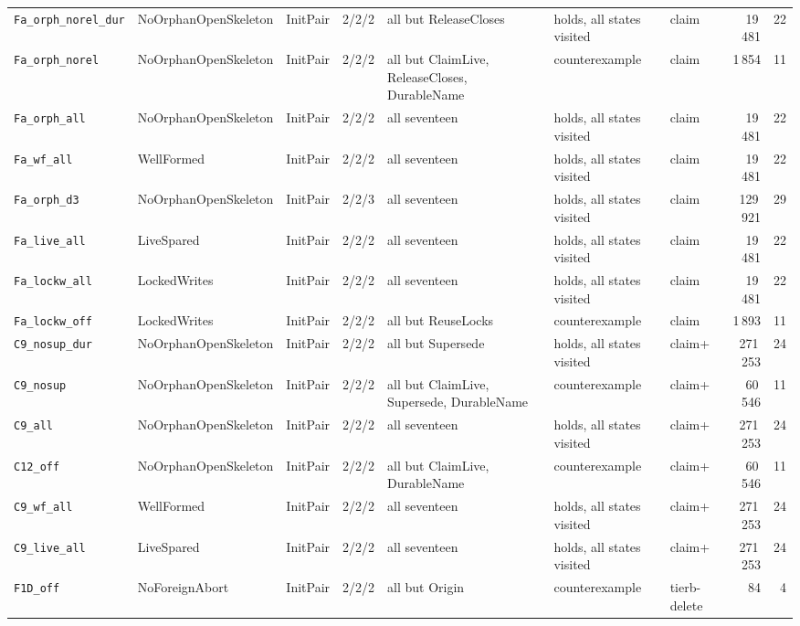 \documentclass[a4paper,10pt,fleqn]{article}
\begin{document}
{\begin{center}
\begin{tabularx}{\textwidth}{@{}l l l l X X l r r@{}}
\texttt{Fa\_orph\_norel\_dur} & NoOrphanOpenSkeleton & InitPair & 2/2/2 & all but ReleaseCloses & holds, all states visited & claim & 19\,481 & 22 \\
\texttt{Fa\_orph\_norel} & NoOrphanOpenSkeleton & InitPair & 2/2/2 & all but ClaimLive, ReleaseCloses, DurableName & counterexample & claim & 1\,854 & 11 \\
\texttt{Fa\_orph\_all} & NoOrphanOpenSkeleton & InitPair & 2/2/2 & all seventeen & holds, all states visited & claim & 19\,481 & 22 \\
\texttt{Fa\_wf\_all} & WellFormed & InitPair & 2/2/2 & all seventeen & holds, all states visited & claim & 19\,481 & 22 \\
\texttt{Fa\_orph\_d3} & NoOrphanOpenSkeleton & InitPair & 2/2/3 & all seventeen & holds, all states visited & claim & 129\,921 & 29 \\
\texttt{Fa\_live\_all} & LiveSpared & InitPair & 2/2/2 & all seventeen & holds, all states visited & claim & 19\,481 & 22 \\
\texttt{Fa\_lockw\_all} & LockedWrites & InitPair & 2/2/2 & all seventeen & holds, all states visited & claim & 19\,481 & 22 \\
\texttt{Fa\_lockw\_off} & LockedWrites & InitPair & 2/2/2 & all but ReuseLocks & counterexample & claim & 1\,893 & 11 \\
\texttt{C9\_nosup\_dur} & NoOrphanOpenSkeleton & InitPair & 2/2/2 & all but Supersede & holds, all states visited & claim+ & 271\,253 & 24 \\
\texttt{C9\_nosup} & NoOrphanOpenSkeleton & InitPair & 2/2/2 & all but ClaimLive, Supersede, DurableName & counterexample & claim+ & 60\,546 & 11 \\
\texttt{C9\_all} & NoOrphanOpenSkeleton & InitPair & 2/2/2 & all seventeen & holds, all states visited & claim+ & 271\,253 & 24 \\
\texttt{C12\_off} & NoOrphanOpenSkeleton & InitPair & 2/2/2 & all but ClaimLive, DurableName & counterexample & claim+ & 60\,546 & 11 \\
\texttt{C9\_wf\_all} & WellFormed & InitPair & 2/2/2 & all seventeen & holds, all states visited & claim+ & 271\,253 & 24 \\
\texttt{C9\_live\_all} & LiveSpared & InitPair & 2/2/2 & all seventeen & holds, all states visited & claim+ & 271\,253 & 24 \\
\texttt{F1D\_off} & NoForeignAbort & InitPair & 2/2/2 & all but Origin & counterexample & tierb-delete & 84 & 4 \\

\end{tabularx}
\end{center}}
\end{document}
